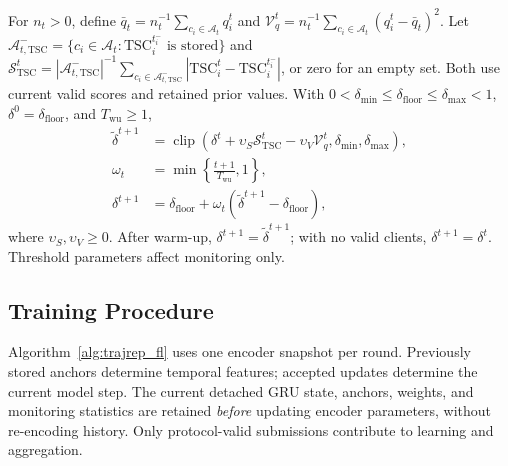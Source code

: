For $n_t>0$, define $\bar q_t=n_t^{-1}\sum_{c_i\in\mathcal A_t}q_i^t$ and $\mathcal V_q^t=n_t^{-1}\sum_{c_i\in\mathcal A_t}(q_i^t-\bar q_t)^2$. Let $\mathcal A_{t,\mathrm{TSC}}^-=\{c_i\in\mathcal A_t:\mathrm{TSC}_i^{t_i^-}\text{ is stored}\}$ and $\mathcal S_{\mathrm{TSC}}^t=|\mathcal A_{t,\mathrm{TSC}}^-|^{-1}\sum_{c_i\in\mathcal A_{t,\mathrm{TSC}}^-}|\mathrm{TSC}_i^t-\mathrm{TSC}_i^{t_i^-}|$, or zero for an empty set. Both use current valid scores and retained prior values. With $0<\delta_{\min}\leq\delta_{\mathrm{floor}}\leq\delta_{\max}<1$, $\delta^0=\delta_{\mathrm{floor}}$, and $T_{\mathrm{wu}}\geq1$,
\begin{equation}
\begin{aligned}
\widetilde\delta^{t+1}&=\operatorname{clip}\!\left(\delta^t+\upsilon_S\mathcal S_{\mathrm{TSC}}^t-\upsilon_V\mathcal V_q^t,\delta_{\min},\delta_{\max}\right),\\
\omega_t&=\min\!\left\{\frac{t+1}{T_{\mathrm{wu}}},1\right\},\\
\delta^{t+1}&=\delta_{\mathrm{floor}}+\omega_t(\widetilde\delta^{t+1}-\delta_{\mathrm{floor}}),
\end{aligned}
\label{eq:method_threshold}
\end{equation}
where $\upsilon_S,\upsilon_V\geq0$. After warm-up, $\delta^{t+1}=\widetilde\delta^{t+1}$; with no valid clients, $\delta^{t+1}=\delta^t$. Threshold parameters affect monitoring only.

\subsection{Training Procedure}
\label{subsec:method_procedure}

Algorithm~\ref{alg:trajrep_fl} uses one encoder snapshot per round. Previously stored anchors determine temporal features; accepted updates determine the current model step. The current detached GRU state, anchors, weights, and monitoring statistics are retained \emph{before} updating encoder parameters, without re-encoding history. Only protocol-valid submissions contribute to learning and aggregation.


